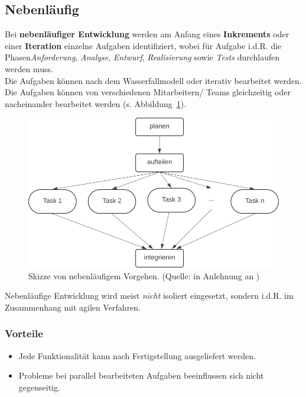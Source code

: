\subsection{Nebenläufig}

\noindent
Bei \textbf{nebenläufiger Entwicklung} werden am Anfang eines \textbf{Inkrements} oder einer \textbf{Iteration} einzelne Aufgaben identifiziert, wobei für Aufgabe i.d.R. die Phasen\textit{Anforderung}, \textit{Analyse},  \textit{Entwurf}, \textit{Realisierung} sowie \textit{Tests} durchlaufen werden muss.\\
Die Aufgaben können nach dem Wasserfallmodell oder iterativ bearbeitet werden.\\
Die Aufgaben können von verschiedenen Mitarbeitern/ Teams gleichzeitig oder nacheinander bearbeitet werden (s. Abbildung~\ref{fig:nebenlaeufig}).\\


\begin{figure}
    \centering
    \includegraphics[scale=0.4]{chapters/Prozessmodelle/img/nebenlaeufigkeit}
    \caption{Skizze von nebenläufigem Vorgehen. (Quelle: in Anlehnung an \cite[29]{Wed09})}
    \label{fig:nebenlaeufig}
\end{figure}


\noindent
Nebenläufige Entwicklung wird meist \textit{nicht} isoliert eingesetzt, sondern i.d.R. im Zusammenhang mit agilen Verfahren.

\subsubsection*{Vorteile}

\begin{itemize}
    \item Jede Funktionalität kann nach Fertigstellung ausgeliefert werden.
    \item Probleme bei parallel bearbeiteten Aufgaben beeinflussen sich nicht gegenseitig.
\end{itemize}

